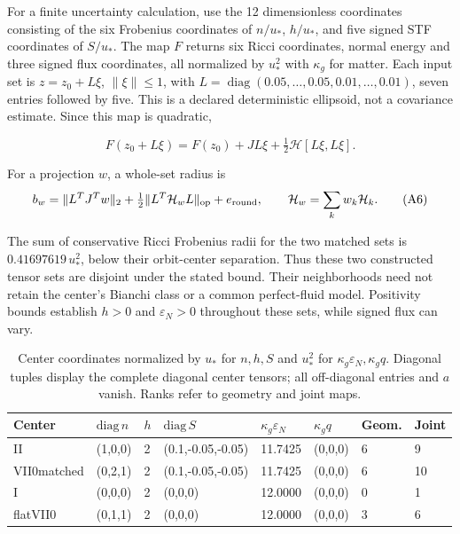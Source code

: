 For a finite uncertainty calculation, use the 12 dimensionless
coordinates consisting of the six Frobenius coordinates of \(n/u_*\),
\(h/u_*\), and five signed STF coordinates of \(S/u_*\). The map \(F\)
returns six Ricci coordinates, normal energy and three signed flux
coordinates, all normalized by \(u_*^2\) with \(\kappa_g\) for matter.
Each input set is \(z=z_0+L\xi\), \(\|\xi\|\le1\), with
\(L=\operatorname{diag}(0.05,\ldots,0.05,0.01,\ldots,0.01)\), seven
entries followed by five. This is a declared deterministic ellipsoid,
not a covariance estimate. Since this map is quadratic,

\begin{equation}
F(z_0+L\xi)=F(z_0)+JL\xi+\tfrac12\mathcal H[L\xi,L\xi].\tag{A5}
\end{equation}

For a projection \(w\), a whole-set radius is \begin{equation}
b_w=\|L^TJ^Tw\|_2+\tfrac12\|L^T\mathcal H_wL\|_{\rm op}
 +e_{\rm round},\qquad \mathcal H_w=\sum_k w_k\mathcal H_k.\tag{A6}
\end{equation}

The sum of conservative Ricci Frobenius radii for the two matched sets
is \(0.41697619\,u_*^2\), below their orbit-center separation. Thus
these two constructed tensor sets are disjoint under the stated bound.
Their neighborhoods need not retain the center's Bianchi class or a
common perfect-fluid model. Positivity bounds establish \(h>0\) and
\(\varepsilon_N>0\) throughout these sets, while signed flux can vary.

\begin{table}[htbp]
\centering\small
\caption{Center coordinates normalized by $u_*$ for $n,h,S$ and $u_*^2$ for $\kappa_g\varepsilon_N,\kappa_gq$. Diagonal tuples display the complete diagonal center tensors; all off-diagonal entries and $a$ vanish. Ranks refer to geometry and joint maps.}\label{tab:geo}
\begin{tabular}{llllllll}
\toprule
Center & $\mathrm{diag}\,n$ & $h$ & $\mathrm{diag}\,S$ & $\kappa_g\varepsilon_N$ & $\kappa_gq$ & Geom. & Joint \\
\midrule
II & (1,0,0) & 2 & (0.1,-0.05,-0.05) & 11.7425 & (0,0,0) & 6 & 9 \\
VII0matched & (0,2,1) & 2 & (0.1,-0.05,-0.05) & 11.7425 & (0,0,0) & 6 & 10 \\
I & (0,0,0) & 2 & (0,0,0) & 12.0000 & (0,0,0) & 0 & 1 \\
flatVII0 & (0,1,1) & 2 & (0,0,0) & 12.0000 & (0,0,0) & 3 & 6 \\
\bottomrule
\end{tabular}
\end{table}

